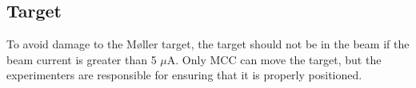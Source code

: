\begin{safetyen}{50}{50}
\subsection{Target}

To avoid damage to the M{\o}ller target, the target should not be in the beam 
if the beam current is greater than
5 $\mu$A. Only MCC can move the target, but the experimenters
are responsible for ensuring that it is properly positioned.\\
\end{safetyen}




%
%
%
%
%
%
%
 




